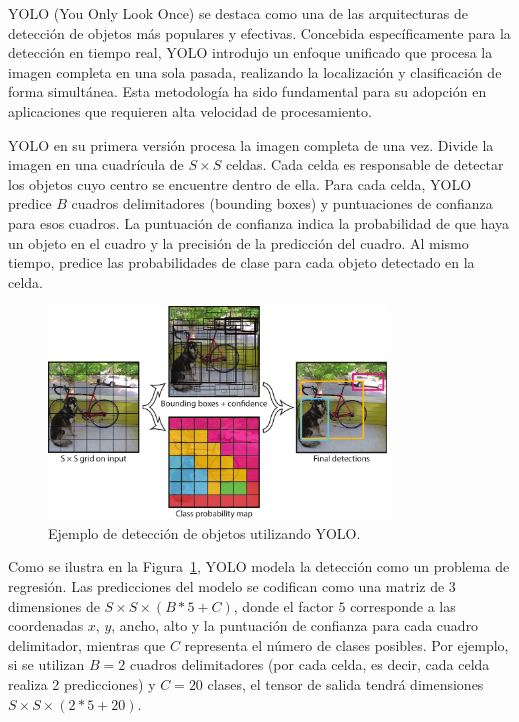 \documentclass[11pt,spanish,listoffigures,listoftables]{tfgetsinf}
\begin{document}
YOLO (You Only Look Once) se destaca como una de las arquitecturas de detección de objetos más populares y efectivas. Concebida específicamente para la detección en tiempo real, YOLO introdujo un enfoque unificado que procesa la imagen completa en una sola pasada, realizando la localización y clasificación de forma simultánea. Esta metodología ha sido fundamental para su adopción en aplicaciones que requieren alta velocidad de procesamiento.

YOLO en su primera versión procesa la imagen completa de una vez. Divide la imagen en una cuadrícula de $S \times S$ celdas. Cada celda es responsable de detectar los objetos cuyo centro se encuentre dentro de ella. Para cada celda, YOLO predice $B$ cuadros delimitadores (bounding boxes) y puntuaciones de confianza para esos cuadros. La puntuación de confianza indica la probabilidad de que haya un objeto en el cuadro y la precisión de la predicción del cuadro. Al mismo tiempo, predice las probabilidades de clase para cada objeto detectado en la celda.

\begin{figure}[H]
   \centering
   \includegraphics[width=0.8\textwidth]{images/estado_del_arte/yolo_detections_example.png}
   \caption{Ejemplo de detección de objetos utilizando YOLO.}
   \label{fig:yolo_detections_example}
\end{figure}

Como se ilustra en la Figura~\ref{fig:yolo_detections_example}\cite{redmon2016lookonceunifiedrealtime}, YOLO modela la detección como un problema de regresión. Las predicciones del modelo se codifican como una matriz de 3 dimensiones de  $S \times S \times (B * 5 + C)$, donde el factor $5$ corresponde a las coordenadas $x$, $y$, ancho, alto y la puntuación de confianza para cada cuadro delimitador, mientras que $C$ representa el número de clases posibles. Por ejemplo, si se utilizan $B=2$ cuadros delimitadores (por cada celda, es decir, cada celda realiza 2 predicciones) y $C=20$ clases, el tensor de salida tendrá dimensiones $S \times S \times (2 * 5 + 20)$. 
\end{document}
